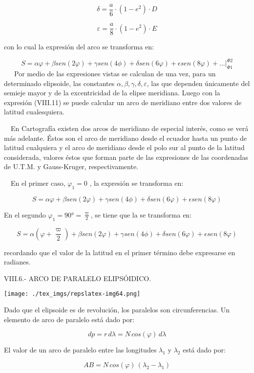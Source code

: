 \documentclass[]{article}
\begin{document}
\[{\delta =\frac{a}{6}\cdot \left(1-e^{{2}}\right)\cdot D}\]

\[{\varepsilon =\frac{a}{8}\cdot \left(1-e^{{2}}\right)\cdot E}\]

con lo cual la expresión del arco se transforma en:

\[S=\alpha \varphi + \beta sen (2\varphi) + \gamma sen (4\phi) + \delta sen (6\varphi) + \epsilon sen (8\varphi) + ... |_{\Phi1}^{\Phi2}\]
~~~Por medio de las expresiones vistas se calculan de una vez, para un
determinado elipsoide, las constantes \({\alpha ,\beta ,\gamma ,\delta
,\varepsilon }\), las que dependen únicamente del semieje mayor y de la
excentricidad de la elipse meridiana. Luego con la expresión (VIII.11)
se puede calcular un arco de meridiano entre dos valores de latitud
cualesquiera.

~~En Cartografía existen dos arcos de meridiano de especial interés,
como se verá más adelante. Éstos son el arco de meridiano desde el
ecuador hasta un punto de latitud cualquiera y el arco de meridiano
desde el polo sur al punto de la latitud considerada, valores éstos que
forman parte de las expresiones de las coordenadas de U.T.M. y
Gauss-Kruger, respectivamente.

~~En el primer caso, \(\varphi_1=0\) , la expresión se transforma en:

\[S=\alpha \varphi + \beta sen (2\varphi) + \gamma sen (4\phi) + \delta sen (6\varphi) + \epsilon sen (8\varphi)\]

En el segundo \(\varphi_1=90°=\frac{\varpi}{2}\), se tiene que la se
transforma en:

\[S=\alpha \left( \varphi + \frac{\varpi}{2} \right) + \beta sen (2\varphi) + \gamma sen (4\phi) + \delta sen (6\varphi) + \epsilon sen (8\varphi)\]

recordando que el valor de la latitud en el primer término debe
expresarse en radianes.

VIII.6.- ARCO DE PARALELO ELIPSÓIDICO.

\texttt{[image: ./tex\_imgs/repslatex-img64.png]}

Dado que el elipsoide es de revolución, los paralelos son
circunferencias. Un elemento de arco de paralelo está dado por:

\[dp=r\,d\lambda=N\,cos(\varphi)\,d\lambda\]

El valor de un arco de paralelo entre las longitudes \(\lambda_1\) y
\(\lambda_2\) está dado por:

\[AB=N\,cos(\varphi)\,(\lambda_2-\lambda_1)\]
\end{document}
